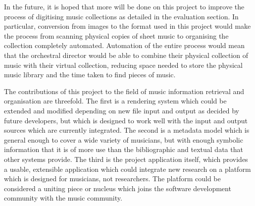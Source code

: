 In the future, it is hoped that more will be done on this project to improve the process of digitising music collections as detailed in the evaluation section. In particular, conversion from images to the format used in this project would make the process from scanning physical copies of sheet music to organising the collection completely automated. Automation of the entire process would mean that the orchestral director would be able to combine their physical collection of music with their virtual collection, reducing space needed to store the physical music library and the time taken to find pieces of music.

The contributions of this project to the field of music information retrieval and organisation are threefold. The first is a rendering system which could be extended and modified depending on new file input and output as decided by future developers, but which is designed to work well with the input and output sources which are currently integrated. The second is a metadata model which is general enough to cover a wide variety of musicians, but with enough symbolic information that it is of more use than the bibliographic and textual data that other systems provide. The third is the project application itself, which provides a usable, extensible application which could integrate new research on a platform which is designed for musicians, not researchers. The platform could be considered a uniting piece or nucleus which joins the software development community with the music community.
